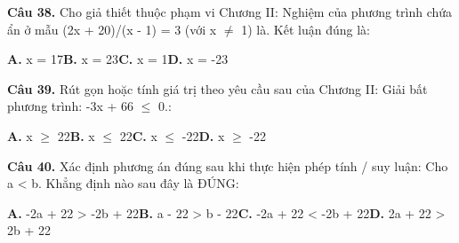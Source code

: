\documentclass[11pt,a4paper]{article}
\begin{document}
\textbf{\color{primary} Câu 38.} Cho giả thiết thuộc phạm vi Chương II: Nghiệm của phương trình chứa ẩn ở mẫu (2x + 20)/(x - 1) = 3 (với x $\ne$ 1) là. Kết luận đúng là:\par
\hspace*{1.5em}\textbf{A.} x = 17\quad\quad \textbf{B.} x = 23\quad\quad \textbf{C.} x = 1\quad\quad \textbf{D.} x = -23\par\vspace{2pt}
\textbf{\color{primary} Câu 39.} Rút gọn hoặc tính giá trị theo yêu cầu sau của Chương II: Giải bất phương trình: -3x + 66 $\le$ 0.:\par
\hspace*{1.5em}\textbf{A.} x $\ge$ 22\quad\quad \textbf{B.} x $\le$ 22\quad\quad \textbf{C.} x $\le$ -22\quad\quad \textbf{D.} x $\ge$ -22\par\vspace{2pt}
\textbf{\color{primary} Câu 40.} Xác định phương án đúng sau khi thực hiện phép tính / suy luận: Cho a < b. Khẳng định nào sau đây là ĐÚNG:\par
\hspace*{1.5em}\textbf{A.} -2a + 22 > -2b + 22\quad\quad \textbf{B.} a - 22 > b - 22\quad\quad \textbf{C.} -2a + 22 < -2b + 22\quad\quad \textbf{D.} 2a + 22 > 2b + 22\par\vspace{2pt}
\end{document}
